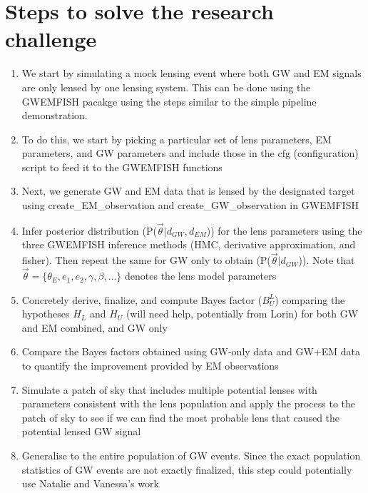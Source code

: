 \documentclass[pdflatex,sn-mathphys-num]{sn-jnl}%
\theoremstyle{thmstyleone}%
\theoremstyle{thmstyletwo}%
\theoremstyle{thmstylethree}%
\begin{document}
\section{Steps to solve the research challenge}
\begin{enumerate}
	\item We start by simulating a mock lensing event where both GW and EM signals are only lensed by one lensing system. This can be done using the GWEMFISH pacakge using the steps similar to the simple pipeline demonstration.
	\item To do this, we start by picking a particular set of lens parameters, EM parameters, and GW parameters and include those in the cfg (configuration) script to feed it to the GWEMFISH functions
	\item Next, we generate GW and EM data that is lensed by the designated target using create\_EM\_observation and create\_GW\_observation in GWEMFISH
	\item Infer posterior distribution (P($\vec{\theta} \vert d_{GW}, d_{EM}$)) for the lens parameters using the three GWEMFISH inference methods (HMC, derivative approximation, and fisher). Then repeat the same for GW only to obtain (P($\vec{\theta} \vert d_{GW}$)). Note that $\vec{\theta} = \{\theta_E, e_1, e_2, \gamma, \beta, \ldots\}$ denotes the lens model parameters
	\item Concretely derive, finalize, and compute Bayes factor ($B^L_U$) comparing the hypotheses $H_L$ and $H_U$ (will need help, potentially from Lorin) for both GW and EM combined, and GW only
	\item Compare the Bayes factors obtained using GW-only data and GW+EM data to quantify the improvement provided by EM observations
	\item Simulate a patch of sky that includes multiple potential lenses with parameters consistent with the lens population and apply the process to the patch of sky to see if we can find the most probable lens that caused the potential lensed GW signal
	\item Generalise to the entire population of GW events. Since the exact population statistics of GW events are not exactly finalized, this step could potentially use Natalie and Vanessa's work
\end{enumerate}
\end{document}
